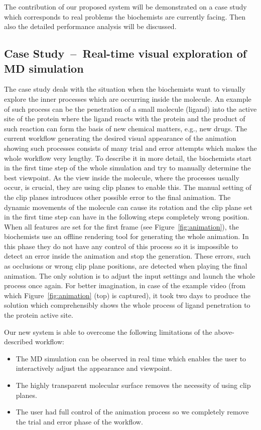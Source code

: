 The contribution of our proposed system will be demonstrated on a case study which corresponds to real problems the biochemists are currently facing. 
Then also the detailed performance analysis will be discussed.

\subsection{Case Study~--~Real-time visual exploration of MD simulation}
The case study deals with the situation when the biochemists want to visually explore the inner processes which are occurring inside the molecule. 
An example of such process can be the penetration of a small molecule (ligand) into the active site of the protein where the ligand reacts with the protein and the product of such reaction can form the basis of new chemical matters, e.g., new drugs. 
The current workflow generating the desired visual appearance of the animation showing such processes consists of many trial and error attempts which makes the whole workflow very lengthy. 
To describe it in more detail, the biochemists start in the first time step of the whole simulation and try to manually determine the best viewpoint.
As the view inside the molecule, where the processes usually occur, is crucial, they are using clip planes to enable this.
The manual setting of the clip planes introduces other possible error to the final animation.
The dynamic movements of the molecule can cause its rotation and the clip plane set in the first time step can have in the following steps completely wrong position.
When all features are set for the first frame (see Figure~\ref{fig:animation}), the biochemists use an offline rendering tool for generating the whole animation.
In this phase they do not have any control of this process so it is impossible to detect an error inside the animation and stop the generation.
These errors, such as occlusions or wrong clip plane positions, are detected when playing the final animation.
The only solution is to adjust the input settings and launch the whole process once again.
For better imagination, in case of the example video (from which Figure~\ref{fig:animation} (top) is captured), it took two days to produce the solution which comprehensibly shows the whole process of ligand penetration to the protein active site.

Our new system is able to overcome the following limitations of the above-described workflow:
\begin{itemize} 
\item The MD simulation can be observed in real time which enables the user to interactively adjust the appearance and viewpoint.
\item The highly transparent molecular surface removes the necessity of using clip planes.
\item The user had full control of the animation process so we completely remove the trial and error phase of the workflow. 
\end{itemize}

